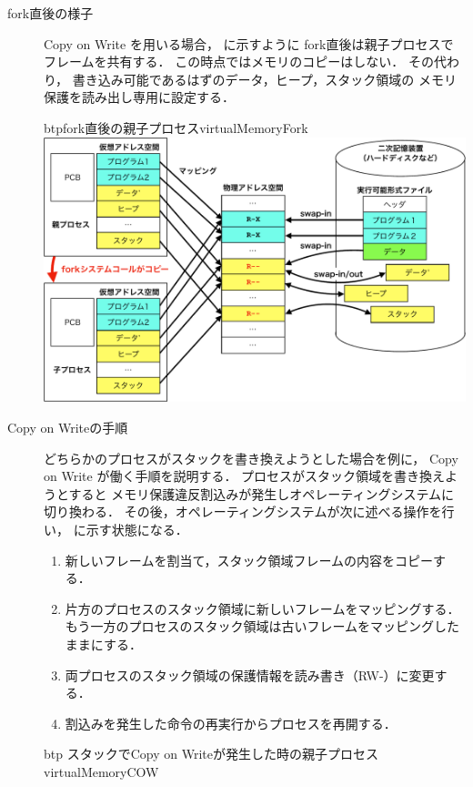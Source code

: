 \begin{description}
\item[fork直後の様子]
  Copy on Write を用いる場合，
  に示すように
  fork直後は親子プロセスでフレームを共有する．
  この時点ではメモリのコピーはしない．
  その代わり，
  書き込み可能であるはずのデータ，ヒープ，スタック領域の
  メモリ保護を読み出し専用に設定する．
  \begin{myfig}{btp}{fork直後の親子プロセス}{virtualMemoryFork}
    \includegraphics[scale=0.66]{Fig/virtualMemoryFork-crop.pdf}
  \end{myfig}
\item[Copy on Writeの手順]
  どちらかのプロセスがスタックを書き換えようとした場合を例に，
  Copy on Write が働く手順を説明する．
  プロセスがスタック領域を書き換えようとすると
  メモリ保護違反割込みが発生しオペレーティングシステムに切り換わる．
  その後，オペレーティングシステムが次に述べる操作を行い，
  に示す状態になる．
  \begin{enumerate}
  \item 新しいフレームを割当て，スタック領域フレームの内容をコピーする．
  \item 片方のプロセスのスタック領域に新しいフレームをマッピングする．
    もう一方のプロセスのスタック領域は古いフレームをマッピングしたままにする．
  \item 両プロセスのスタック領域の保護情報を読み書き（RW-）に変更する．
  \item 割込みを発生した命令の再実行からプロセスを再開する．
  \end{enumerate}
  \begin{myfig}{btp}
    {スタックでCopy on Writeが発生した時の親子プロセス}{virtualMemoryCOW}

\end{myfig}
\end{description}
